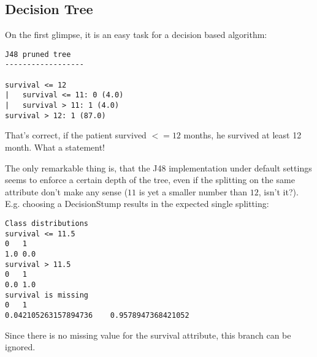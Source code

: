 \documentclass[paper=a4, fontsize=11pt]{scrartcl} %
\numberwithin{equation}{section} %
\numberwithin{figure}{section} %
\numberwithin{table}{section} %
\begin{document}
\paragraph{}

%
%



\subsection{Decision Tree}
On the first glimpse, it is an easy task for a decision based algorithm:

\begin{lstlisting}
J48 pruned tree
------------------

survival <= 12
|   survival <= 11: 0 (4.0)
|   survival > 11: 1 (4.0)
survival > 12: 1 (87.0)
\end{lstlisting}

That's correct, if the patient survived $ <= 12 $ months, he survived at least 12 month. What a statement! 

The only remarkable thing is, that the J48 implementation under default settings seems to enforce a certain depth of the tree, even if the splitting on the same attribute don't make any sense ($ 11 $ is yet a smaller number than $ 12 $, isn't it?). E.g. choosing a DecisionStump results in the expected single splitting: 
\begin{lstlisting}
Class distributions
survival <= 11.5
0   1   
1.0 0.0 
survival > 11.5
0   1   
0.0 1.0 
survival is missing
0   1   
0.042105263157894736    0.9578947368421052
\end{lstlisting}
Since there is no missing value for the survival attribute, this branch can be ignored.
\end{document}
